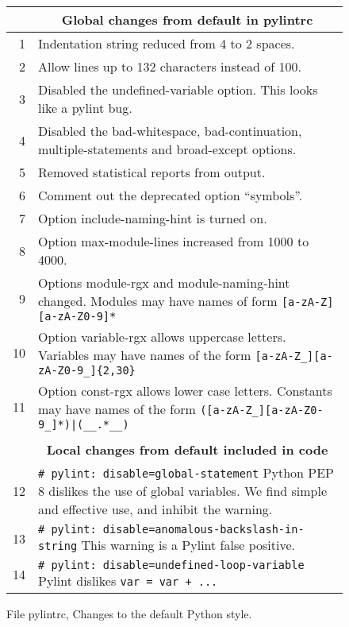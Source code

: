 \documentclass[12pt]{article}
\newcommand{\pylintrc}{\mbox{\textcolor{NUTCOLOUR}{pylintrc}}}
\begin{document}
\begin{figure}[ht]
\begin{center}
\begin{tabular}{|r|p{0.9\LinePrinterwidth}|}
\hline
    & \multicolumn{1}{|c|}{\textbf{Global changes from default in \pylintrc}} \\ \hline\hline
 1  & Indentation string reduced from 4 to 2 spaces. \\ \hline
 2  & Allow lines up to 132 characters instead of 100. \\ \hline
 3  & Disabled the undefined-variable option.  This looks like a pylint bug. \\ \hline
 4  & Disabled the bad-whitespace, bad-continuation, multiple-statements and broad-except options. \\ \hline
 5  & Removed statistical reports from output. \\ \hline
 6  & Comment out the deprecated option ``symbols''. \\ \hline
 7  & Option include-naming-hint is turned on. \\ \hline
 8  & Option max-module-lines increased from 1000 to 4000. \\ \hline
 9  & Options module-rgx and module-naming-hint changed.
      Modules may have names of form \texttt{[a-zA-Z][a-zA-Z0-9]*} \\ \hline
10  & Option variable-rgx allows uppercase letters.
      Variables may have names of the form \texttt{[a-zA-Z\_][a-zA-Z0-9\_]\{2,30\}} \\ \hline
11  & Option const-rgx allows lower case letters.
      Constants may have names of the form \texttt{([a-zA-Z\_][a-zA-Z0-9\_]*)|(\_\_.*\_\_)} \\ \hline\hline
\multicolumn{2}{c}{\vphantom{3mm}} \\ \hline
    & \multicolumn{1}{|c|}{\textbf{Local changes from default included in code}} \\ \hline\hline
12  & \verb`# pylint: disable=global-statement`
      Python PEP 8 dislikes the use of global variables.
      We find simple and effective use, and inhibit the warning. \\ \hline
13  & \verb`# pylint: disable=anomalous-backslash-in-string`
      This warning is a Pylint false positive. \\ \hline
14  & \verb`# pylint: disable=undefined-loop-variable`
      Pylint dislikes \texttt{var = var + ...} \\ \hline\hline
\end{tabular}
\caption{File \pylintrc, Changes to the default Python style.\label{fig:lint}}
\end{center}
\end{figure}
\end{document}
